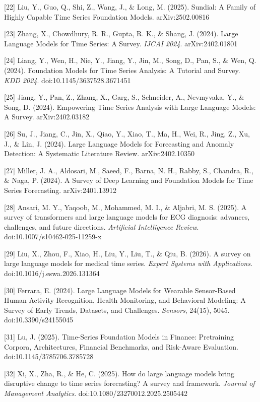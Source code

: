 {[}22{]} Liu, Y., Guo, Q., Shi, Z., Wang, J., \& Long, M. (2025). Sundial: A Family of Highly Capable Time Series Foundation Models. arXiv:2502.00816

{[}23{]} Zhang, X., Chowdhury, R. R., Gupta, R. K., \& Shang, J. (2024). Large Language Models for Time Series: A Survey. \emph{IJCAI 2024}. arXiv:2402.01801

{[}24{]} Liang, Y., Wen, H., Nie, Y., Jiang, Y., Jin, M., Song, D., Pan, S., \& Wen, Q. (2024). Foundation Models for Time Series Analysis: A Tutorial and Survey. \emph{KDD 2024}. doi:10.1145/3637528.3671451

{[}25{]} Jiang, Y., Pan, Z., Zhang, X., Garg, S., Schneider, A., Nevmyvaka, Y., \& Song, D. (2024). Empowering Time Series Analysis with Large Language Models: A Survey. arXiv:2402.03182

{[}26{]} Su, J., Jiang, C., Jin, X., Qiao, Y., Xiao, T., Ma, H., Wei, R., Jing, Z., Xu, J., \& Lin, J. (2024). Large Language Models for Forecasting and Anomaly Detection: A Systematic Literature Review. arXiv:2402.10350

{[}27{]} Miller, J. A., Aldosari, M., Saeed, F., Barna, N. H., Rabby, S., Chandra, R., \& Naga, P. (2024). A Survey of Deep Learning and Foundation Models for Time Series Forecasting. arXiv:2401.13912

{[}28{]} Ansari, M. Y., Yaqoob, M., Mohammed, M. I., \& Aljabri, M. S. (2025). A survey of transformers and large language models for ECG diagnosis: advances, challenges, and future directions. \emph{Artificial Intelligence Review}. doi:10.1007/s10462-025-11259-x

{[}29{]} Liu, X., Zhou, F., Xiao, H., Liu, Y., Liu, T., \& Qiu, B. (2026). A survey on large language models for medical time series. \emph{Expert Systems with Applications}. doi:10.1016/j.eswa.2026.131364

{[}30{]} Ferrara, E. (2024). Large Language Models for Wearable Sensor-Based Human Activity Recognition, Health Monitoring, and Behavioral Modeling: A Survey of Early Trends, Datasets, and Challenges. \emph{Sensors}, 24(15), 5045. doi:10.3390/s24155045

{[}31{]} Lu, J. (2025). Time-Series Foundation Models in Finance: Pretraining Corpora, Architectures, Financial Benchmarks, and Risk-Aware Evaluation. doi:10.1145/3785706.3785728

{[}32{]} Xi, X., Zha, R., \& He, C. (2025). How do large language models bring disruptive change to time series forecasting? A survey and framework. \emph{Journal of Management Analytics}. doi:10.1080/23270012.2025.2505442

